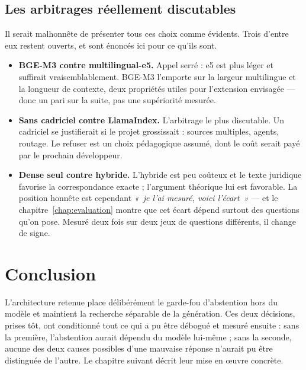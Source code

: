 \subsection{Les arbitrages réellement discutables}

Il serait malhonnête de présenter tous ces choix comme évidents. Trois d'entre eux restent
ouverts, et sont énoncés ici pour ce qu'ils sont.

\begin{itemize}
  \item \textbf{BGE-M3 contre multilingual-e5.} Appel serré : e5 est plus léger et suffirait
        vraisemblablement. BGE-M3 l'emporte sur la largeur multilingue et la longueur de contexte,
        deux propriétés utiles pour l'extension envisagée --- donc un pari sur la suite, pas une
        supériorité mesurée.
  \item \textbf{Sans cadriciel contre LlamaIndex.} L'arbitrage le plus discutable. Un cadriciel se
        justifierait si le projet grossissait : sources multiples, agents, routage. Le refuser est
        un choix pédagogique assumé, dont le coût serait payé par le prochain développeur.
  \item \textbf{Dense seul contre hybride.} L'hybride est peu coûteux et le texte juridique
        favorise la correspondance exacte ; l'argument théorique lui est favorable. La position
        honnête est cependant \emph{«~je l'ai mesuré, voici l'écart~»} --- et le
        chapitre~\ref{chap:evaluation} montre que cet écart dépend surtout des questions qu'on
        pose. Mesuré deux fois sur deux jeux de questions différents, il change de signe.
\end{itemize}

\section*{Conclusion}

L'architecture retenue place délibérément le garde-fou d'abstention hors du modèle et maintient
la recherche séparable de la génération. Ces deux décisions, prises tôt, ont conditionné tout ce
qui a pu être débogué et mesuré ensuite : sans la première, l'abstention aurait dépendu du modèle
lui-même ; sans la seconde, aucune des deux causes possibles d'une mauvaise réponse n'aurait pu
être distinguée de l'autre. Le chapitre suivant décrit leur mise en œuvre concrète.
